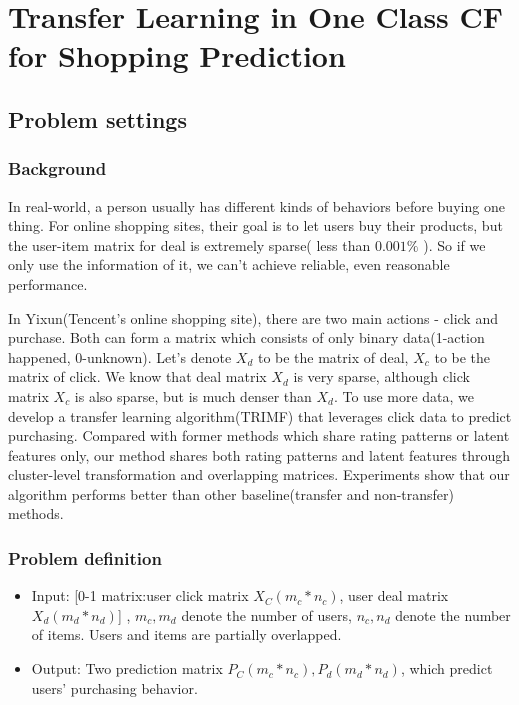 \chapter{Transfer Learning in One Class CF for Shopping Prediction}
\label{chp:trimf}
\section{Problem settings}
\subsection{Background}
\par{
In real-world, a person usually has different kinds of behaviors before buying one thing. For online shopping sites, their goal is to let users buy their products, but the user-item matrix for deal is extremely sparse( less than $0.001\%$ ). So if we only use the information of it, we can't achieve reliable, even reasonable performance. 

In Yixun(Tencent's online shopping site), there are two main actions - click and purchase. Both can form a matrix which consists of only binary data(1-action happened, 0-unknown). Let's denote $X_d$ to be the matrix of deal, $X_c$ to be the matrix of click. We know that deal matrix $X_d$ is very sparse, although click matrix $X_c$ is also sparse, but is much denser than $X_d$. To use more data, we develop a transfer learning algorithm(TRIMF) that leverages click data to predict purchasing. Compared with former methods which share rating patterns or latent features only, our method shares both rating patterns and latent features through cluster-level transformation and overlapping matrices. Experiments show that our algorithm performs better than other baseline(transfer and non-transfer) methods.}

\subsection{Problem definition}
  \begin{itemize}
  \item Input: [0-1 matrix:user click matrix $X_C(m_c*n_c)$, user deal matrix $X_d(m_d*n_d)$] , $m_c, m_d$ denote the number of users, $n_c, n_d$ denote the number of items. Users and items are partially overlapped.
  \item Output: Two prediction matrix $P_C(m_c*n_c), P_d(m_d*n_d)$, which predict users' purchasing behavior.
  \end{itemize}



